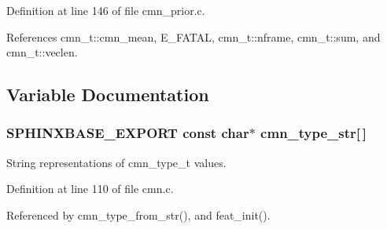 Definition at line 146 of file cmn\-\_\-prior.\-c.



References cmn\-\_\-t\-::cmn\-\_\-mean, E\-\_\-\-F\-A\-T\-A\-L, cmn\-\_\-t\-::nframe, cmn\-\_\-t\-::sum, and cmn\-\_\-t\-::veclen.



\subsection{Variable Documentation}
\subsubsection[{cmn\-\_\-type\-\_\-str}]{\setlength{\rightskip}{0pt plus 5cm}S\-P\-H\-I\-N\-X\-B\-A\-S\-E\-\_\-\-E\-X\-P\-O\-R\-T const char$\ast$ cmn\-\_\-type\-\_\-str[$\,$]}\label{cmn_8h_ae2ab0bad7168386076c43fc2a421867f}


String representations of cmn\-\_\-type\-\_\-t values. 



Definition at line 110 of file cmn.\-c.



Referenced by cmn\-\_\-type\-\_\-from\-\_\-str(), and feat\-\_\-init().

